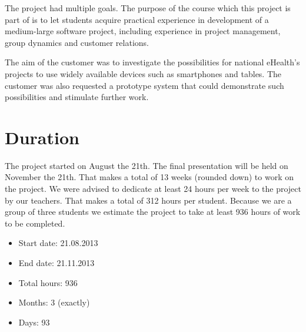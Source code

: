The project had multiple goals.
The purpose of the course which this project is part of is to let students acquire practical experience in development of a medium-large software project, including experience in project management, group dynamics and customer relations.

The aim of the customer was to investigate the possibilities for national eHealth's projects to use widely available devices such as smartphones and tables. The customer was also requested a prototype system that could demonstrate such possibilities and stimulate further work.

\section{Duration}
\label{section:duration}
The project started on August the 21th. The final presentation will be held on November the 21th. That makes a total of 13 weeks (rounded down) to work on the project. We were advised to dedicate at least 24 hours per week to the project by our teachers. %
That makes a total of 312 hours per student. Because we are a group of three students we estimate the project to take at least 936 hours of work to be completed.

\begin{itemize}
\item Start date: 21.08.2013
\item End date: 21.11.2013
\item Total hours: 936
\item Months: 3 (exactly)
\item Days: 93
\end{itemize}

